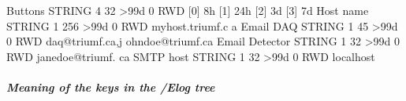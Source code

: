 \begin{DoxyCode}
                                        [13]            
                                        [14]            
                                        [15]            
                                        [16]            
                                        [17]            
                                        [18]            
                                        [19]  
Buttons                         STRING  4     32    >99d 0   RWD  
                                        [0]             8h
                                        [1]             24h
                                        [2]             3d
                                        [3]             7d
Host name                       STRING  1     256   >99d 0   RWD  myhost.triumf.c
      a
Email DAQ                       STRING  1     45    >99d 0   RWD  daq@triumf.ca,j
      ohndoe@triumf.ca
Email Detector                  STRING  1     32    >99d 0   RWD  janedoe@triumf.
      ca
SMTP host                       STRING  1     32    >99d 0   RWD  localhost
\end{DoxyCode}
\hypertarget{F_Elog_F_ODB_Elog_Tree_Keys}{}\subparagraph{Meaning of the keys in the /Elog tree}\label{F_Elog_F_ODB_Elog_Tree_Keys}
